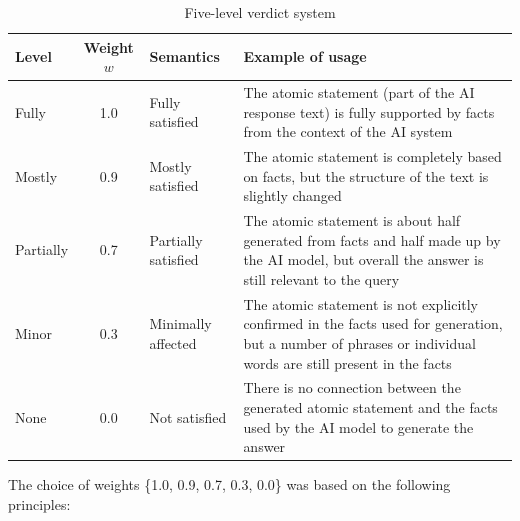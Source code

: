\documentclass[sn-basic]{sn-jnl}
\theoremstyle{thmstyleone}%
\theoremstyle{thmstyletwo}%
\theoremstyle{thmstylethree}%
\begin{document}
\begin{table}[h]
\caption{Five-level verdict system}
\label{tab:verdict-levels}
\centering
\begin{tabular}{@{}lclp{5.5cm}@{}}
\toprule
\textbf{Level} & \textbf{Weight $w$} & \textbf{Semantics} & \textbf{Example of usage} \\
\midrule
Fully & 1.0 & Fully satisfied & The atomic statement (part of the AI response text) is fully supported by facts from the context of the AI system\\
\addlinespace
Mostly & 0.9 & Mostly satisfied & The atomic statement is completely based on facts, but the structure of the text is slightly changed \\
\addlinespace
Partially & 0.7 & Partially satisfied & The atomic statement is about half generated from facts and half made up by the AI model, but overall the answer is still relevant to the query \\
\addlinespace
Minor & 0.3 & Minimally affected & The atomic statement is not explicitly confirmed in the facts used for generation, but a number of phrases or individual words are still present in the facts \\
\addlinespace
None & 0.0 & Not satisfied & There is no connection between the generated atomic statement and the facts used by the AI model to generate the answer\\
\bottomrule
\end{tabular}
\end{table}

The choice of weights \{1.0, 0.9, 0.7, 0.3, 0.0\} was based on the following principles:
\end{document}
